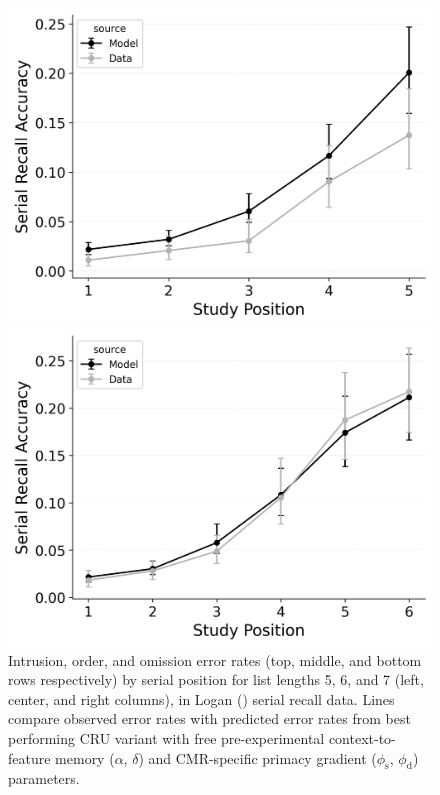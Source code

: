 \documentclass[
  man,
  floatsintext,
  longtable,
  nolmodern,
  notxfonts,
  notimes,
  draftfirst,
  colorlinks=true,linkcolor=blue,citecolor=blue,urlcolor=blue]{apa7}
\begin{document}
\begin{figure}

\caption{\label{fig-best-serial-errors}Intrusion, order, and omission
error rates (top, middle, and bottom rows respectively) by serial
position for list lengths 5, 6, and 7 (left, center, and right columns),
in Logan () serial recall data.
Lines compare observed error rates with predicted error rates from best
performing CRU variant with free pre-experimental context-to-feature
memory (\(\alpha\), \(\delta\)) and CMR-specific primacy gradient
(\(\phi_\text{s}\), \(\phi_\text{d}\)) parameters.}

\begin{minipage}{0.33\linewidth}
\includegraphics{figures/bw_Gordon2021_CRU_with_Pre-Expt_and_Primacy_Confusable_Fitting_intrusion_error_rate_LL5.png}\end{minipage}%
%
\begin{minipage}{0.33\linewidth}
\includegraphics{figures/bw_Gordon2021_CRU_with_Pre-Expt_and_Primacy_Confusable_Fitting_intrusion_error_rate_LL6.png}\end{minipage}%

\end{figure}
\end{document}

